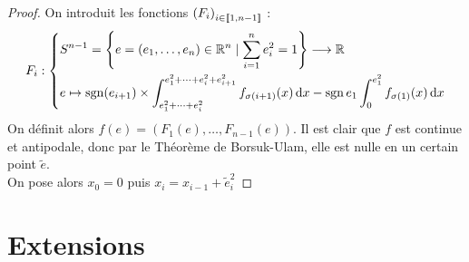 \documentclass{cours}
\begin{document}
\begin{proof}
    On introduit les fonctions $\left(F_{i}\right)_{i\in \left\llbracket 1, n - 1\right\rrbracket}$  : 
    \[
        F_{i} : \left\{
        \begin{aligned}
            &S^{n - 1} = \left\{e = (e_{1}, \ldots, e_{n}) \in \mathbb{R}^{n} \mid \sum_{i = 1}^{n} e_{i}^{2} = 1\right\} \longrightarrow \mathbb{R}\\
            &e \mapsto \operatorname{sgn}(e_{i + 1}) \times \int_{e_{1}^{2} + \cdots + e_{i}^{2}}^{e_{1}^{2} + \cdots + e_{i}^{2} + e_{i + 1}^{2}} f_{\sigma(i + 1)}(x){\rm \, d} x - \operatorname{sgn}{e_{1}}\int_{0}^{e_{1}^{2}}f_{\sigma(1)}(x){\rm \, d} x
        \end{aligned}\right.
    \]
    On définit alors $f(e) = \left(F_{1}(e), \ldots, F_{n - 1}(e)\right)$. Il est clair que $f$ est continue et antipodale, donc par le Théorème de Borsuk-Ulam, elle est nulle en un certain point $\tilde{e}$.\\
    On pose alors $x_{0} = 0$ puis $x_{i} = x_{i - 1} + \tilde{e}_{i}^{2}$
\end{proof}


\section{Extensions}
\end{document}
